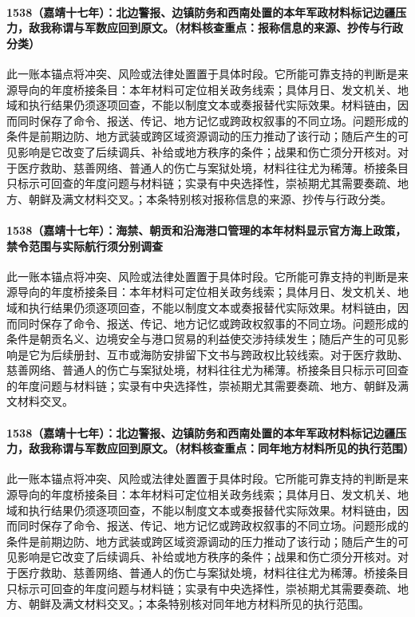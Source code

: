 \paragraph{1538（嘉靖十七年）：北边警报、边镇防务和西南处置的本年军政材料标记边疆压力，敌我称谓与军数应回到原文。（材料核查重点：报称信息的来源、抄传与行政分类）} 此一账本锚点将冲突、风险或法律处置置于具体时段。它所能可靠支持的判断是来源导向的年度桥接条目：本年材料可定位相关政务线索；具体月日、发文机关、地域和执行结果仍须逐项回查，不能以制度文本或奏报替代实际效果。材料链由，因而同时保存了命令、报送、传记、地方记忆或跨政权叙事的不同立场。问题形成的条件是前期边防、地方武装或跨区域资源调动的压力推动了该行动；随后产生的可见影响是它改变了后续调兵、补给或地方秩序的条件；战果和伤亡须分开核对。对于医疗救助、慈善网络、普通人的伤亡与案狱处境，材料往往尤为稀薄。桥接条目只标示可回查的年度问题与材料链；实录有中央选择性，崇祯期尤其需要奏疏、地方、朝鲜及满文材料交叉。；本条特别核对报称信息的来源、抄传与行政分类。

\paragraph{1538（嘉靖十七年）：海禁、朝贡和沿海港口管理的本年材料显示官方海上政策，禁令范围与实际航行须分别调查} 此一账本锚点将冲突、风险或法律处置置于具体时段。它所能可靠支持的判断是来源导向的年度桥接条目：本年材料可定位相关政务线索；具体月日、发文机关、地域和执行结果仍须逐项回查，不能以制度文本或奏报替代实际效果。材料链由，因而同时保存了命令、报送、传记、地方记忆或跨政权叙事的不同立场。问题形成的条件是朝贡名义、边境安全与港口贸易的利益使交涉持续发生；随后产生的可见影响是它为后续册封、互市或海防安排留下文书与跨政权比较线索。对于医疗救助、慈善网络、普通人的伤亡与案狱处境，材料往往尤为稀薄。桥接条目只标示可回查的年度问题与材料链；实录有中央选择性，崇祯期尤其需要奏疏、地方、朝鲜及满文材料交叉。

\paragraph{1538（嘉靖十七年）：北边警报、边镇防务和西南处置的本年军政材料标记边疆压力，敌我称谓与军数应回到原文。（材料核查重点：同年地方材料所见的执行范围）} 此一账本锚点将冲突、风险或法律处置置于具体时段。它所能可靠支持的判断是来源导向的年度桥接条目：本年材料可定位相关政务线索；具体月日、发文机关、地域和执行结果仍须逐项回查，不能以制度文本或奏报替代实际效果。材料链由，因而同时保存了命令、报送、传记、地方记忆或跨政权叙事的不同立场。问题形成的条件是前期边防、地方武装或跨区域资源调动的压力推动了该行动；随后产生的可见影响是它改变了后续调兵、补给或地方秩序的条件；战果和伤亡须分开核对。对于医疗救助、慈善网络、普通人的伤亡与案狱处境，材料往往尤为稀薄。桥接条目只标示可回查的年度问题与材料链；实录有中央选择性，崇祯期尤其需要奏疏、地方、朝鲜及满文材料交叉。；本条特别核对同年地方材料所见的执行范围。

